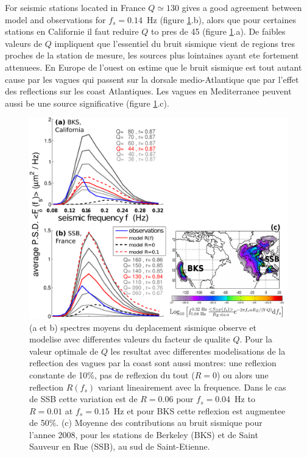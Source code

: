 For seismic stations located in  France  $Q \simeq 130$ gives a good agreement between model and observations for $f_s=0.14$~Hz 
(figure \ref{fig:sismo_mean_spec}.b), alors que pour certaines stations en Californie il faut reduire $Q$ to pres de 45 
(figure \ref{fig:sismo_mean_spec}.a). De faibles valeurs de $Q$ impliquent que l'essentiel du bruit sismique vient de regions tres proches 
de la station de mesure, les sources plus lointaines ayant ete fortement attenuees.
En Europe de l'ouest on estime que le bruit sismique est tout autant cause par les vagues qui passent sur la dorsale medio-Atlantique que par l'effet des 
reflections sur les coast Atlantiques. Les vagues en Mediterranee peuvent aussi be une source significative (figure \ref{fig:sismo_mean_spec}.c). 
\begin{figure}
\centerline{\includegraphics[width=\textwidth]{FIGS_CH_SISMO/mean_2008_sources_BKS_SSB_only.pdf}}
  \caption{(a et b) spectres moyens du deplacement sismique observe et modelise avec differentes valeurs du facteur de qualite $Q$. Pour la 
valeur optimale de $Q$ les resultat avec differentes modelisations de la reflection des vagues par la coast sont aussi montres: une 
reflexion constante de 10\%, pas de reflexion du tout ($R=0$) ou alors une reflection $R(f_s)$ variant lineairement avec la frequence. Dans le
cas de SSB cette variation est de $R=0.06$ pour $f_s=0.04$~Hz to $R=0.01$ at $f_s=0.15$~Hz et pour BKS cette reflexion est augmentee de 50\%. 
(c) Moyenne des contributions au bruit sismique pour l'annee 2008, pour les stations de Berkeley (BKS) et de Saint Sauveur en Rue (SSB), au sud 
de Saint-Etienne. 
}
\label{fig:sismo_mean_spec}
\end{figure}

